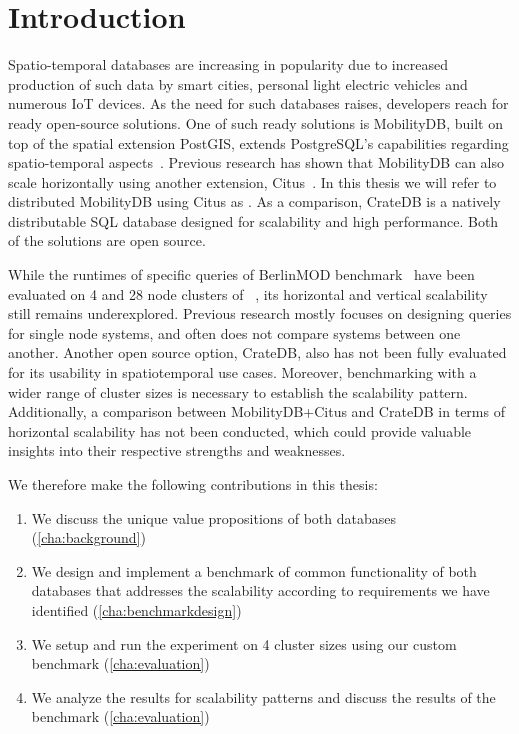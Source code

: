 \section{Introduction}
\label{cha:introduction}

Spatio-temporal databases are increasing in popularity due to increased production of such data by smart cities, personal light electric vehicles and numerous IoT devices.
As the need for such databases raises, developers reach for ready open-source solutions.
One of such ready solutions is MobilityDB, built on top of the spatial extension PostGIS, extends PostgreSQL's capabilities regarding spatio-temporal aspects~\cite{zimanyiMobilityDBMobilityDatabase2020}.
Previous research has shown that MobilityDB can also scale horizontally using another extension, Citus~\cite{bakli-2020,bakli-2019,cubukcuCitusDistributedPostgreSQL2021}.
In this thesis we will refer to distributed MobilityDB using Citus as \mobilitydbc.
As a comparison, CrateDB is a natively distributable SQL database designed for scalability and high performance.
Both of the solutions are open source.

While the runtimes of specific queries of BerlinMOD benchmark~\cite{duntgenBerlinMODBenchmarkMoving2009} have been evaluated on 4 and 28 node clusters of \mobilitydbc~\cite{bakli-2020}, its horizontal and vertical scalability still remains underexplored.
Previous research mostly focuses on designing queries for single node systems, and often does not compare systems between one another. 
Another open source option, CrateDB, also has not been fully evaluated for its usability in spatiotemporal use cases.
Moreover, benchmarking with a wider range of cluster sizes is necessary to establish the scalability pattern.
Additionally, a comparison between MobilityDB+Citus and CrateDB in terms of horizontal scalability has not been conducted, which could provide valuable insights into their respective strengths and weaknesses.

We therefore make the following contributions in this thesis:

\begin{enumerate}
    \item We discuss the unique value propositions of both databases (\cref{cha:background})
    \item We design and implement a benchmark of common functionality of both databases that addresses the scalability according to requirements we have identified (\cref{cha:benchmarkdesign})
    \item We setup and run the experiment on 4 cluster sizes using our custom benchmark (\cref{cha:evaluation})
    \item We analyze the results for scalability patterns and discuss the results of the benchmark (\cref{cha:evaluation})
\end{enumerate}
